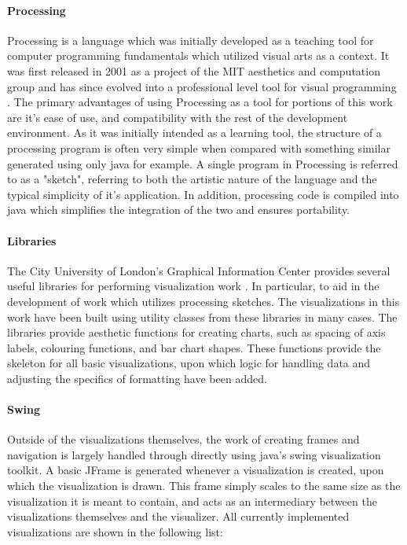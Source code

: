 \paragraph{Processing}
Processing is a language which was initially developed as a teaching tool for computer programming fundamentals which utilized visual arts as a context. It was first released in 2001 as a project of the MIT aesthetics and computation group and has since evolved into a professional level tool for visual programming \citep{Fry2015}. The primary advantages of using Processing as a tool for portions of this work are it's ease of use, and compatibility with the rest of the development environment. As it was initially intended as a learning tool, the structure of a processing program is often very simple when compared with something similar generated using only java for example. A single program in Processing is referred to as a "sketch", referring to both the artistic nature of the language and the typical simplicity of it's application. In addition, processing code is compiled into java which simplifies the integration of the two and ensures portability. 

\paragraph{Libraries}
The City University of London's Graphical Information Center provides several useful libraries for performing visualization work \citep{CityUniversityLondon2013}. In particular, to aid in the development of work which utilizes processing sketches. The visualizations in this work have been built using utility classes from these libraries in many cases. The libraries provide aesthetic functions for creating charts, such as spacing of axis labels, colouring functions, and bar chart shapes. These functions provide the skeleton for all basic visualizations, upon which logic for handling data and adjusting the specifics of formatting have been added.   

\paragraph{Swing}
Outside of the visualizations themselves, the work of creating frames and navigation is largely handled through directly using java's swing visualization toolkit. A basic JFrame is generated whenever a visualization is created, upon which the visualization is drawn. This frame simply scales to the same size as the visualization it is meant to contain, and acts as an intermediary between the visualizations themselves and the visualizer. All currently implemented visualizations are shown in the following list:
\\

